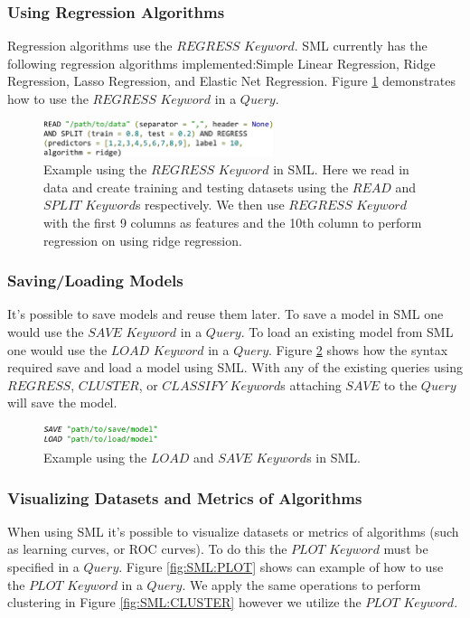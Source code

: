 \documentclass[jair,twoside,11pt,theapa]{article}
\begin{document}
\subsubsection{Using Regression Algorithms}
Regression algorithms use the \(REGRESS\) \(Keyword\). SML currently has the following regression algorithms implemented:Simple Linear Regression, Ridge Regression, Lasso Regression, and Elastic Net Regression. Figure \ref{fig:SML:REGRESS} demonstrates how to use the \(REGRESS\) \(Keyword\) in a \(Query\).

\begin{figure}
\includegraphics[width=0.6\textwidth]{figs/REGRESS.png}
\centering
\caption{Example using the \(REGRESS\) \(Keyword\) in SML. Here we read in data and create training and testing datasets using the \(READ\) and \(SPLIT\) \(Keyword\)s respectively. We then use \(REGRESS\) \(Keyword\) with the first 9 columns as features and the 10th column to perform regression on using ridge regression.}
\label{fig:SML:REGRESS}
\end{figure}

\subsubsection{Saving/Loading Models}
It's possible to save models and reuse them later. To save a model in SML one would use the \(SAVE\) \(Keyword\) in a \(Query\). To load an existing model from SML one would use the \(LOAD\) \(Keyword\) in a \(Query\). Figure \ref{fig:SML:SAVE_LOAD} shows how the syntax required save and load a model using SML. With any of the existing queries using \(REGRESS\), \(CLUSTER\), or \(CLASSIFY\) \(Keyword\)s attaching \(SAVE\) to the \(Query\) will save the model. 

\begin{figure}
\includegraphics[width=0.3\textwidth]{figs/SAVE_LOAD.png}
\centering
\caption{Example using the \(LOAD\) and \(SAVE\) \(Keyword\)s in SML.}
\label{fig:SML:SAVE_LOAD}
\end{figure}

\subsubsection{Visualizing Datasets and Metrics of Algorithms}
When using SML it's possible to visualize datasets or metrics of algorithms (such as learning curves, or ROC curves). To do this the \(PLOT\) \(Keyword\) must be specified in a \(Query\). Figure \ref{fig:SML:PLOT} shows can example of how to use the \(PLOT\) \(Keyword\) in a \(Query\). We apply the same operations to perform clustering in Figure \ref{fig:SML:CLUSTER} however we utilize the \(PLOT\) \(Keyword\).
\end{document}

